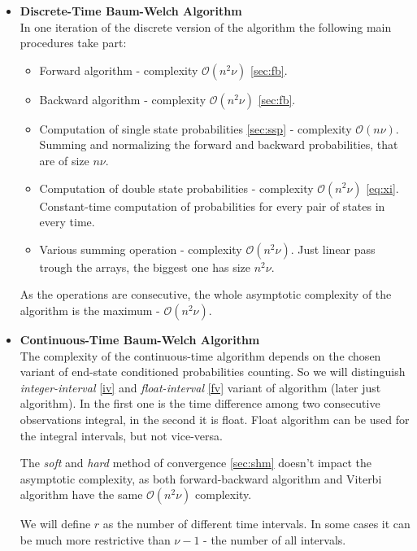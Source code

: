 \documentclass[thesis=M,english]{FITthesis}[2012/10/20]
\begin{document}
\begin{itemize}\label{it:dtc}
\item \textbf{ Discrete-Time Baum-Welch Algorithm } \\
In one iteration of the discrete version of the algorithm the following main procedures take part:
\begin{itemize}
\item Forward algorithm - complexity $\mathcal{O}(n^2\nu)$ \ref{sec:fb}.
\item Backward algorithm - complexity $\mathcal{O}(n^2\nu)$ \ref{sec:fb}.
\item Computation of single state probabilities \ref{sec:ssp} - complexity $\mathcal{O}(n\nu)$. Summing and normalizing the forward and backward probabilities, that are of size $n\nu$.
\item Computation of double state probabilities - complexity $\mathcal{O}(n^2\nu)$ \eqref{eq:xi}. Constant-time computation of probabilities for every pair of states in every time.
\item Various summing operation - complexity $\mathcal{O}(n^2\nu)$. Just linear pass trough the arrays, the biggest one has size $n^2\nu$.
\end{itemize}

As the operations are consecutive, the whole asymptotic complexity of the algorithm is the maximum -  $\mathcal{O}(n^2\nu)$.

\item \textbf{ Continuous-Time Baum-Welch Algorithm } \\

The complexity of the continuous-time algorithm depends on the chosen variant of end-state conditioned probabilities counting. So we will distinguish \textit{integer-interval} \ref{iv} and \textit{float-interval} \ref{fv} variant of algorithm (later just algorithm). In the first one is the time difference among two consecutive observations integral, in the second it is float. Float algorithm can be used for the integral intervals, but not vice-versa. 

The \textit{soft} and \textit{hard} method of convergence \ref{sec:shm} doesn't impact the asymptotic complexity, as both forward-backward algorithm and Viterbi algorithm 
have the same $\mathcal{O}(n^2 \nu)$ complexity.

We will define $r$ as the number of different time intervals. In some cases it can be much more restrictive than $\nu - 1$ - the number of all intervals.


\end{itemize}
\end{document}
